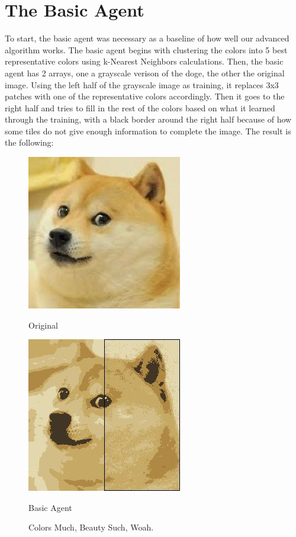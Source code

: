 \documentclass[11pt]{article}
\begin{document}
\section{The Basic Agent}
To start, the basic agent was necessary as a baseline of how well our advanced algorithm works. The basic agent begins with clustering the colors into 5 best representative colors using k-Nearest Neighbors calculations. Then, the basic agent has 2 arrays, one a grayscale verison of the doge, the other the original image. Using the left half of the grayscale image as training, it replaces 3x3 patches with one of the representative colors accordingly. Then it goes to the right half and tries to fill in the rest of the colors based on what it learned through the training, with a black border around the right half because of how some tiles do not give enough information to complete the image. The result is the following:

\begin{figure}[h]
\begin{minipage}[c]{0.5\textwidth}
\centering
\includegraphics[scale=0.94]{images/smolDoge.jpg}
\begin{center}
Original
\end{center}
\end{minipage}
\begin{minipage}[c]{0.5\textwidth}
\centering
\includegraphics[scale=0.70]{images/basic.jpg}
\begin{center}
Basic Agent
\end{center}
\end{minipage}
\caption{Colors Much, Beauty Such, Woah.}
\end{figure}
\end{document}
